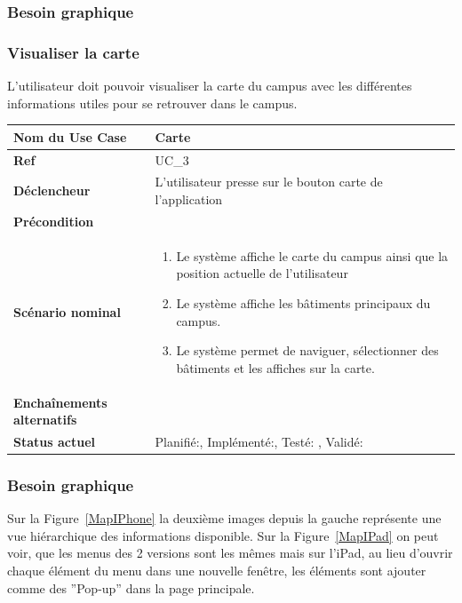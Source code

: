 		\subsubsection*{Besoin graphique}


		\subsubsection{Visualiser la carte}
					L'utilisateur doit pouvoir visualiser la carte du campus avec les différentes informations utiles pour se retrouver dans le campus.\\[0.2cm]
					\begin{longtable}{|l|p{10cm}|}
						\hline \textbf{Nom du Use Case} & Carte \\ 
						\hline \textbf{Ref} & UC\_3  \\ 
						\hline \textbf{Déclencheur} & L'utilisateur presse sur le bouton carte de l'application \\
						\hline \textbf{Précondition} &  \\
						\hline \textbf{Scénario nominal} & 
						\begin{enumerate}
							\item Le système affiche le carte du campus ainsi que la position actuelle de l'utilisateur
							\item Le système affiche les bâtiments principaux du campus.
							\item Le système permet de naviguer, sélectionner des bâtiments  et les affiches sur la carte.
						\end{enumerate}
						\\ 
						\hline \textbf{Enchaînements alternatifs} & \\
						\hline \textbf{Status actuel} & Planifié:\CheckedBox , Implémenté:\CheckedBox  , Testé: \CheckedBox  , Validé: \CheckedBox  \\
						\hline 
					\end{longtable} 
			\subsubsection*{Besoin graphique}
					Sur la Figure~\ref{MapIPhone} la deuxième images depuis la gauche représente une vue hiérarchique des informations disponible.
					Sur la Figure~\ref{MapIPad} on peut voir, que les menus des 2 versions sont les mêmes mais sur l'iPad, au lieu d'ouvrir chaque élément du menu dans une nouvelle fenêtre, les éléments sont ajouter comme des ''Pop-up'' dans la page principale.

